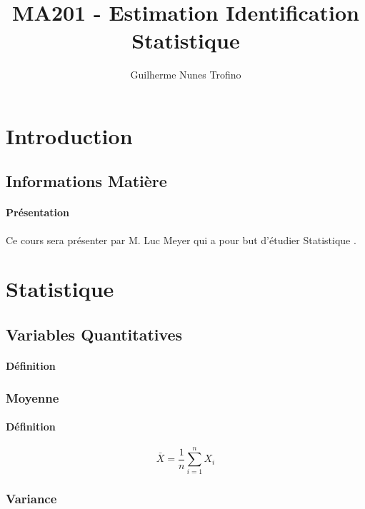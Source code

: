 \documentclass{article}
\title{MA201 - Estimation Identification Statistique}
\author{Guilherme Nunes Trofino}
\begin{document}
\maketitle

\newpage\tableofcontents

\section{Introduction}



\subsection{Informations Matière}
\paragraph{Présentation}Ce cours sera présenter par M. Luc Meyer qui a pour but d'étudier Statistique .


\section{Statistique}
\subsection{Variables Quantitatives}
\paragraph{Définition}

\subsubsection{Moyenne}
\paragraph{Définition}
\begin{equation}
    \boxed{
        \bar{X} = \frac{1}{n} \sum^{n}_{i=1} X_{i}
    }
\end{equation}

\subsubsection{Variance}
\end{document}
